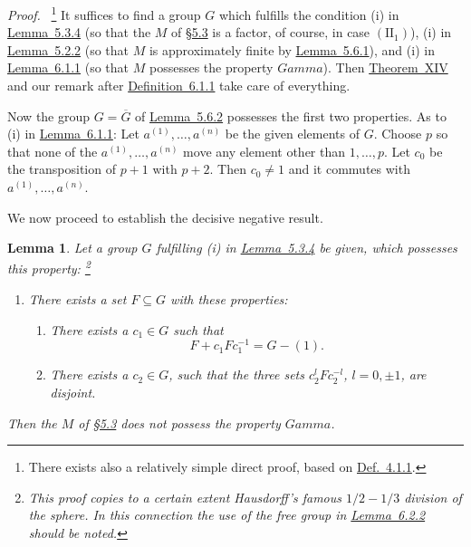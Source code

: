 \documentclass[b5paper,twoside]{article}
\newcommand{\secref}[2]{\hyperref[#1]{\mbox{\S#2}}}
\newcommand{\thmref}[2]{\hyperref[#1]{\mbox{Theorem~#2}}}
\newcommand{\lemref}[2]{\hyperref[#1]{\mbox{Lemma~#2}}}
\newcommand{\defref}[2]{\hyperref[#1]{\mbox{Definition~#2}}}
\theoremstyle{mvnplain}
\newtheorem{lemma}{Lemma}[section]
\renewenvironment{proof}[1][Proof]{%
  \par\addvspace{0.35\baselineskip}%
  \noindent\textit{#1.}\ \normalfont\ignorespaces
}{%
  \par\addvspace{0.35\baselineskip}%
}
\newcommand{\M}{\mathbf M}
\def\M{M}%
\def\Gamma{Gamma}%
\def\mathfrak#1{#1}%
\begin{document}
\begin{proof}\footnote{There exists also a relatively simple direct proof,
based on \hyperref[def:4.1.1]{Def.~4.1.1}.}
It suffices to find a group $\mathfrak G$ which fulfills the condition (i) in
\lemref{lem:5.3.4}{5.3.4} (so that the $\M$ of \secref{sec:5.3}{5.3} is a
factor, of course, in case $(\mathrm{II}_1)$), (i) in
\lemref{lem:5.2.2}{5.2.2} (so that $\M$ is approximately finite by
\lemref{lem:5.6.1}{5.6.1}), and (i) in \lemref{lem:6.1.1}{6.1.1} (so that
$\M$ possesses the property $\Gamma$). Then \thmref{thm:XIV}{XIV} and our
remark after \defref{def:6.1.1}{6.1.1} take care of everything.

Now the group $\mathfrak G=\overline{\mathfrak G}$ of
\lemref{lem:5.6.2}{5.6.2} possesses the first two properties. As to (i) in
\lemref{lem:6.1.1}{6.1.1}: Let $a^{(1)},\ldots,a^{(n)}$ be the given
elements of $\mathfrak G$. Choose $p$ so that none of the
$a^{(1)},\ldots,a^{(n)}$ move any element other than $1,\ldots,p$. Let $c_0$
be the transposition of $p+1$ with $p+2$. Then $c_0\ne1$ and it commutes with
$a^{(1)},\ldots,a^{(n)}$.
\end{proof}

We now proceed to establish the decisive negative result.

\begin{lemma}\label{lem:6.2.1}
Let a group $\mathfrak G$ fulfilling (i) in \lemref{lem:5.3.4}{5.3.4} be
given, which possesses this property:
\footnote{This proof copies to a certain
extent Hausdorff's famous $1/2-1/3$ division of the sphere. In this connection
the use of the free group in \lemref{lem:6.2.2}{6.2.2} should be noted.}

\begin{enumerate}[label=(i),leftmargin=3em]
\item There exists a set $\mathfrak F\subseteq\mathfrak G$ with these
properties:
  \begin{enumerate}[label=(i\textsubscript{\arabic*}),leftmargin=3em]
  \item There exists a $c_1\in\mathfrak G$ such that
  \[
    \mathfrak F+c_1\mathfrak F c_1^{-1}=\mathfrak G-(1).
  \]
  \item There exists a $c_2\in\mathfrak G$, such that the three sets
  $c_2^l\mathfrak F c_2^{-l}$, $l=0,\pm1$, are disjoint.
  \end{enumerate}
\end{enumerate}
Then the $\M$ of \secref{sec:5.3}{5.3} does not possess the property $\Gamma$.
\end{lemma}
\end{document}
